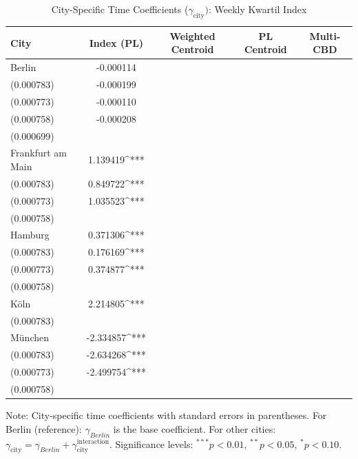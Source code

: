 \begin{table}[h!]
\centering
\caption{City-Specific Time Coefficients ($\gamma_{\text{city}})$: Weekly Kwartil Index}
\label{tab:city_gammas_index_wk}
\begin{tabular}{lcccc}
\toprule
City & Index (PL) & Weighted Centroid & PL Centroid & Multi-CBD \\
\midrule
Berlin & -0.000114 \\ (0.000783) & -0.000199 \\ (0.000773) & -0.000110 \\ (0.000758) & -0.000208 \\ (0.000699) \\
Frankfurt am Main & 1.139419^{***} \\ (0.000783) & 0.849722^{***} \\ (0.000773) & 1.035523^{***} \\ (0.000758) &  \\
Hamburg & 0.371306^{***} \\ (0.000783) & 0.176169^{***} \\ (0.000773) & 0.374877^{***} \\ (0.000758) &  \\
Köln & 2.214805^{***} \\ (0.000783) &  &  &  \\
München & -2.334857^{***} \\ (0.000783) & -2.634268^{***} \\ (0.000773) & -2.499754^{***} \\ (0.000758) &  \\
\bottomrule
\end{tabular}
\begin{tablenotes}[para]
\small
Note: City-specific time coefficients with standard errors in parentheses.
For Berlin (reference): $\gamma_{Berlin}$ is the base coefficient.
For other cities: $\gamma_{\text{city}} = \gamma_{Berlin} + \gamma_{\text{city}}^{\text{interaction}}$.
Significance levels: $^{***} p<0.01$, $^{**} p<0.05$, $^{*} p<0.10$.
\end{tablenotes}
\end{table}
